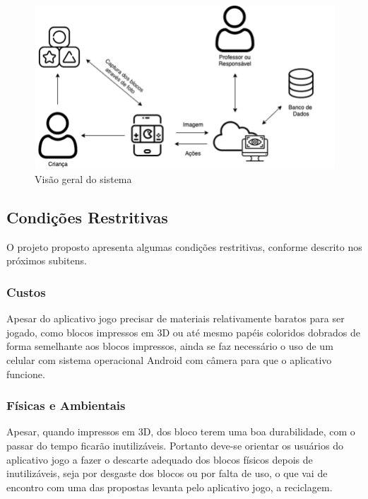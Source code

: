     \begin{figure}[H]
        \caption{Visão geral do sistema}
        \begin{center}
            \includegraphics[width=\linewidth]{Imagens/cap3/diagrama_blocos.png}
        \end{center}
        \label{figura:diagrama_blocos}
    \end{figure}
    
    \subsection{Condições Restritivas}
    O projeto proposto apresenta algumas condições restritivas, conforme descrito
    nos próximos subitens.

        \subsubsection{Custos}
        Apesar do aplicativo jogo precisar de materiais relativamente baratos para ser jogado, como blocos impressos em 3D ou até mesmo papéis coloridos dobrados de forma semelhante aos blocos impressos, ainda se faz necessário o uso de um celular com sistema operacional Android com câmera para que o aplicativo funcione. 
            
        \subsubsection{Físicas e Ambientais}
        Apesar, quando impressos em 3D, dos bloco terem uma boa durabilidade, com o passar do tempo ficarão inutilizáveis. Portanto deve-se orientar os usuários do aplicativo jogo a fazer o descarte adequado dos blocos físicos depois de inutilizáveis, seja por desgaste dos blocos ou por falta de uso, o que vai de encontro com uma das propostas levanta pelo aplicativo jogo, a reciclagem.
        
